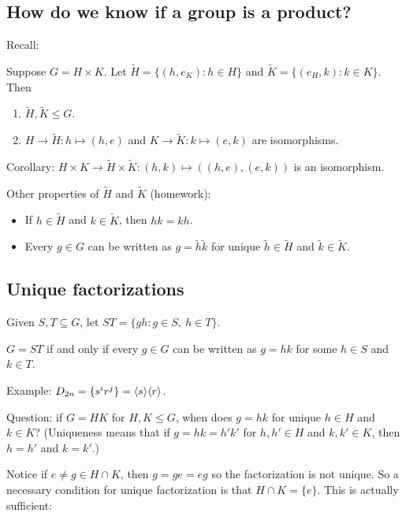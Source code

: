 \documentclass[12pt,letterpaper]{report}
\begin{document}
\pagebreak
\subsection{How do we know if a group is a product?}

Recall:
\begin{prop}{}{}
  Suppose $G = H \times K$.
  Let $\tilde{H} = \{(h, e_K) : h \in H\}$ and $\tilde{K} = \{(e_H, k): k \in K\}$.
  Then
  \begin{enumerate}
    \item $\tilde{H}, \tilde{K} \leq G$.
    \item $H \to \tilde{H} : h \mapsto (h, e)$ and $K \to \tilde{K} : k \mapsto (e, k)$ are
    isomorphisms.
  \end{enumerate}
\end{prop}

Corollary: $H \times K \to \tilde{H} \times \tilde{K} : (h, k) \mapsto ((h, e), (e, k))$ is an
isomorphism.

Other properties of $\tilde{H}$ and $\tilde{K}$ (homework):
\begin{itemize}
  \item If $h \in \tilde{H}$ and $k \in \tilde{K}$, then $hk = kh$.
  \item Every $g \in G$ can be written as $g = \tilde{h}\tilde{k}$ for unique
    $\tilde{h} \in \tilde{H}$ and $\tilde{k} \in \tilde{K}$.
\end{itemize}

\pagebreak
\subsection{Unique factorizations}

Given $S, T \subseteq G$, let $ST = \{gh : g \in S, \ h \in T\}$.

\begin{lem}{}{}
  $G = ST$ if and only if every $g \in G$ can be written as $g = hk$ for some $h \in S$ and
  $k \in T$.
\end{lem}

Example: $D_{2n} = \{s^i r^j\} = \langle s\rangle\langle r\rangle$.

Question: if $G = HK$ for $H, K \leq G$, when does $g = hk$ for unique $h \in H$ and $k \in K$?
(Uniqueness means that if $g = hk = h'k'$ for $h, h' \in H$ and $k, k' \in K$, then $h = h'$ and
$k = k'$.)

Notice if $e \neq g \in H \cap K$, then $g = ge = eg$ so the factorization is not unique.
So a necessary condition for unique factorization is that $H \cap K = \{e\}$.
This is actually sufficient:
\end{document}
